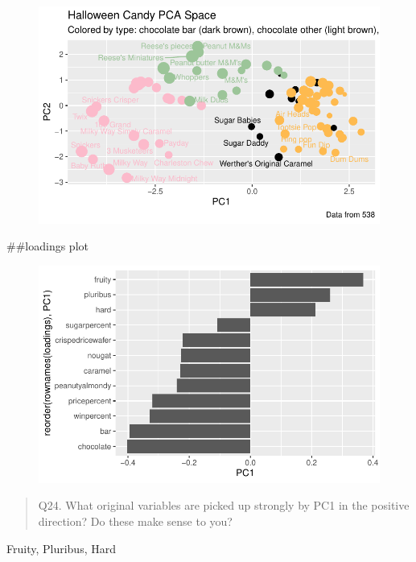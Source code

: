 \documentclass[
  letterpaper,
  DIV=11,
  numbers=noendperiod]{scrartcl}
\newenvironment{Shaded}{\begin{snugshade}}{\end{snugshade}}
\newcommand{\FunctionTok}[1]{\textcolor[rgb]{0.28,0.35,0.67}{#1}}
\newcommand{\NormalTok}[1]{\textcolor[rgb]{0.00,0.23,0.31}{#1}}
\newcommand{\OtherTok}[1]{\textcolor[rgb]{0.00,0.23,0.31}{#1}}
\newcommand{\SpecialCharTok}[1]{\textcolor[rgb]{0.37,0.37,0.37}{#1}}
\begin{document}
\begin{figure}[H]

{\centering \includegraphics{class09_files/figure-pdf/unnamed-chunk-31-1.pdf}

}

\end{figure}

\#\#loadings plot

\begin{Shaded}
\end{Shaded}

\begin{figure}[H]

{\centering \includegraphics{class09_files/figure-pdf/unnamed-chunk-32-1.pdf}

}

\end{figure}

\begin{quote}
Q24. What original variables are picked up strongly by PC1 in the
positive direction? Do these make sense to you?
\end{quote}

Fruity, Pluribus, Hard
\end{document}
